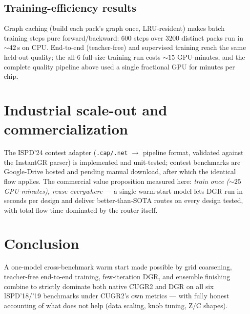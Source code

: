 \documentclass[11pt]{article}
\begin{document}
\subsection{Training-efficiency results}
Graph caching (build each pack's graph once, LRU-resident) makes batch
training steps pure forward/backward: 600 steps over 3200 distinct packs run
in ${\sim}42$\,s on CPU. End-to-end (teacher-free) and supervised training
reach the same held-out quality; the all-6 full-size training run costs
${\sim}15$ GPU-minutes, and the complete quality pipeline above used a
single fractional GPU for minutes per chip.

\section{Industrial scale-out and commercialization}
The ISPD'24 contest adapter (\texttt{.cap/.net} $\to$ pipeline format,
validated against the InstantGR parser) is implemented and unit-tested;
contest benchmarks are Google-Drive hosted and pending manual download, after
which the identical flow applies. The commercial value proposition measured
here: \emph{train once (${\sim}25$ GPU-minutes), reuse everywhere} --- a
single warm-start model lets DGR run in seconds per design and deliver
better-than-SOTA routes on every design tested, with total flow time
dominated by the router itself.

\section{Conclusion}
A one-model cross-benchmark warm start made possible by grid coarsening,
teacher-free end-to-end training, few-iteration DGR, and ensemble finishing
combine to strictly dominate both native CUGR2 and DGR on all six
ISPD'18/'19 benchmarks under CUGR2's own metrics --- with fully honest
accounting of what does not help (data scaling, knob tuning, Z/C shapes).
\end{document}
